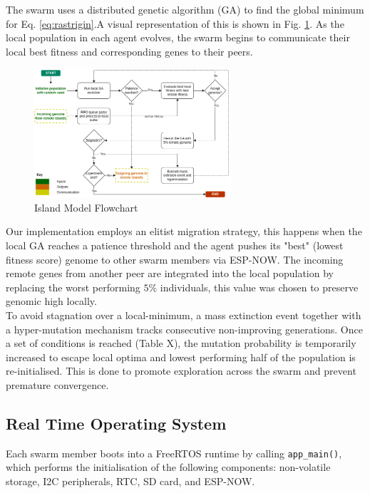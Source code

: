 \documentclass[conference]{IEEEtran}
\begin{document}
The swarm uses a distributed genetic algorithm (GA) to find the global minimum for Eq. \ref{eq:rastrigin}.A visual representation of this is shown in Fig. \ref{fig:ga}. As the local population in each agent evolves, the swarm begins to communicate their local best fitness and corresponding genes to their peers.\\

\begin{figure}[t]
    \centering
    \includegraphics[width=0.65\textwidth]{ga.png}
    \caption{Island Model Flowchart}
    \label{fig:ga}
\end{figure}

Our implementation employs an elitist migration strategy, this happens when the local GA reaches a patience threshold and the agent pushes its "best" (lowest fitness score) genome to other swarm members via ESP-NOW. The incoming remote genes from another peer are integrated into the local population by replacing the worst performing $5\%$ individuals, this value was chosen to preserve genomic high locally.\\ 

To avoid stagnation over a local-minimum, a mass extinction event together with a hyper-mutation mechanism tracks consecutive non-improving generations. Once a set of conditions is reached (Table X), the mutation probability is temporarily increased to escape local optima and lowest performing half of the population is re-initialised. This is done to promote exploration across the swarm and prevent premature convergence. 

\subsection{Real Time Operating System}

Each swarm member boots into a FreeRTOS runtime by calling \texttt{app\_main()}, which performs the initialisation of the following components: non-volatile storage, I2C peripherals, RTC, SD card, and ESP-NOW.
\end{document}
